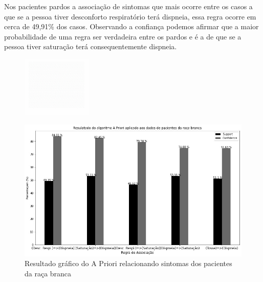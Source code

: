\documentclass[tcc1]{uftex}
\begin{document}
    Nos pacientes pardos a associação de sintomas que mais ocorre entre os casos a que se a pessoa tiver desconforto respiratório terá dispneia, essa regra ocorre em cerca de 49,91\% dos casos. Observando a confiança podemos afirmar que a maior probabilidade de uma regra ser verdadeira entre os pardos e é a de que se a pessoa tiver saturação terá consequentemente dispneia.
    
    \begin{figure}[!h]
    \centering
    \includegraphics[width=3.3cm]{fund0.png}
    \end{figure}
    
    \begin{figure}[!h]
    \centering
    \includegraphics[width=14cm]{1_Branca_apriori.jpg}
    \caption{Resultado gráfico do A Priori relacionando sintomas dos pacientes da raça branca}
    \end{figure}
    
\end{document}

